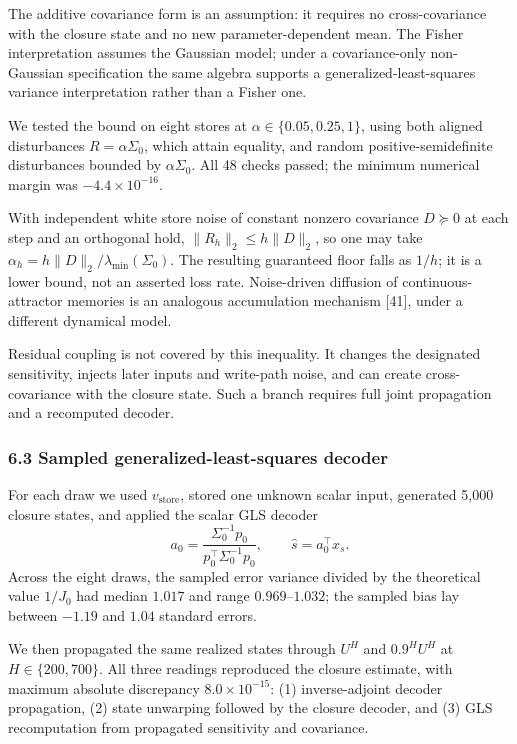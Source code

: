\documentclass[
  10pt,
]{article}
\begin{document}
The additive covariance form is an assumption: it requires no
cross-covariance with the closure state and no new parameter-dependent
mean. The Fisher interpretation assumes the Gaussian model; under a
covariance-only non-Gaussian specification the same algebra supports a
generalized-least-squares variance interpretation rather than a Fisher
one.

We tested the bound on eight stores at \(\alpha\in\{0.05,0.25,1\}\),
using both aligned disturbances \(R=\alpha\Sigma_0\), which attain
equality, and random positive-semidefinite disturbances bounded by
\(\alpha\Sigma_0\). All 48 checks passed; the minimum numerical margin
was \(-4.4\times10^{-16}\).

With independent white store noise of constant nonzero covariance
\(D\succeq0\) at each step and an orthogonal hold,
\(\|R_h\|_2\le h\|D\|_2\), so one may take
\(\alpha_h=h\|D\|_2/\lambda_{\min}(\Sigma_0)\). The resulting guaranteed
floor falls as \(1/h\); it is a lower bound, not an asserted loss rate.
Noise-driven diffusion of continuous-attractor memories is an analogous
accumulation mechanism {[}41{]}, under a different dynamical model.

Residual coupling is not covered by this inequality. It changes the
designated sensitivity, injects later inputs and write-path noise, and
can create cross-covariance with the closure state. Such a branch
requires full joint propagation and a recomputed decoder.

\subsubsection{6.3 Sampled generalized-least-squares
decoder}\label{sampled-generalized-least-squares-decoder}

For each draw we used \(v_{\mathrm{store}}\), stored one unknown scalar
input, generated 5,000 closure states, and applied the scalar GLS
decoder \[
a_0=\frac{\Sigma_0^{-1}p_0}{p_0^\top\Sigma_0^{-1}p_0},\qquad
\hat s=a_0^\top x_s.
\] Across the eight draws, the sampled error variance divided by the
theoretical value \(1/J_0\) had median \(1.017\) and range
\(0.969\)--\(1.032\); the sampled bias lay between \(-1.19\) and
\(1.04\) standard errors.

We then propagated the same realized states through \(U^H\) and
\(0.9^HU^H\) at \(H\in\{200,700\}\). All three readings reproduced the
closure estimate, with maximum absolute discrepancy
\(8.0\times10^{-15}\): (1) inverse-adjoint decoder propagation, (2)
state unwarping followed by the closure decoder, and (3) GLS
recomputation from propagated sensitivity and covariance.
\end{document}
